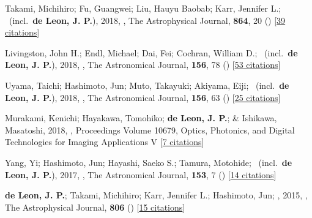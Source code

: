 \item[{\color{numcolor}\scriptsize6}] Takami, Michihiro; Fu, Guangwei; Liu, Hauyu Baobab; Karr, Jennifer L.; \etal\ (incl.\ \textbf{de Leon, J. P.}), 2018, , The Astrophysical Journal, \textbf{864}, 20 () [\href{https://ui.adsabs.harvard.edu/abs/2018ApJ...864...20T}{39 citations}]

\item[{\color{numcolor}\scriptsize5}] Livingston, John H.; Endl, Michael; Dai, Fei; Cochran, William D.; \etal\ (incl.\ \textbf{de Leon, J. P.}), 2018, , The Astronomical Journal, \textbf{156}, 78 () [\href{https://ui.adsabs.harvard.edu/abs/2018AJ....156...78L}{53 citations}]

\item[{\color{numcolor}\scriptsize4}] Uyama, Taichi; Hashimoto, Jun; Muto, Takayuki; Akiyama, Eiji; \etal\ (incl.\ \textbf{de Leon, J. P.}), 2018, , The Astronomical Journal, \textbf{156}, 63 () [\href{https://ui.adsabs.harvard.edu/abs/2018AJ....156...63U}{25 citations}]

\item[{\color{numcolor}\scriptsize3}] Murakami, Kenichi; Hayakawa, Tomohiko; \textbf{de Leon, J. P.}; \& Ishikawa, Masatoshi, 2018, , Proceedings Volume 10679, Optics, Photonics, and Digital Technologies for Imaging Applications V [\href{https://www.spiedigitallibrary.org/conference-proceedings-of-spie/10679/2306621/Real-time-high-speed-motion-blur-compensation-method-using-galvanometer/10.1117/12.2306621.short}{7 citations}]

\item[{\color{numcolor}\scriptsize2}] Yang, Yi; Hashimoto, Jun; Hayashi, Saeko S.; Tamura, Motohide; \etal\ (incl.\ \textbf{de Leon, J. P.}), 2017, , The Astronomical Journal, \textbf{153}, 7 () [\href{https://ui.adsabs.harvard.edu/abs/2017AJ....153....7Y}{14 citations}]

\item[{\color{numcolor}\scriptsize1}] \textbf{de Leon, J. P.}; Takami, Michihiro; Karr, Jennifer L.; Hashimoto, Jun; \etal, 2015, , The Astrophysical Journal, \textbf{806} () [\href{https://ui.adsabs.harvard.edu/abs/2015ApJ...806L..10D}{15 citations}]